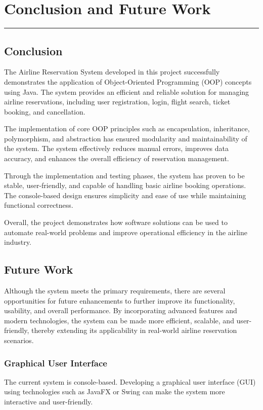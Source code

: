 \chapter{Conclusion and Future Work}
\noindent\rule{\linewidth}{2pt}
\section{Conclusion}

The Airline Reservation System developed in this project successfully demonstrates the application of Object-Oriented Programming (OOP) concepts using Java. The system provides an efficient and reliable solution for managing airline reservations, including user registration, login, flight search, ticket booking, and cancellation.

The implementation of core OOP principles such as encapsulation, inheritance, polymorphism, and abstraction has ensured modularity and maintainability of the system. The system effectively reduces manual errors, improves data accuracy, and enhances the overall efficiency of reservation management.

Through the implementation and testing phases, the system has proven to be stable, user-friendly, and capable of handling basic airline booking operations. The console-based design ensures simplicity and ease of use while maintaining functional correctness.

Overall, the project demonstrates how software solutions can be used to automate real-world problems and improve operational efficiency in the airline industry.

\section{Future Work}
Although the system meets the primary requirements, there are several opportunities for future enhancements to further improve its functionality, usability, and overall performance. By incorporating advanced features and modern technologies, the system can be made more efficient, scalable, and user-friendly, thereby extending its applicability in real-world airline reservation scenarios.
\subsection{Graphical User Interface}

The current system is console-based. Developing a graphical user interface (GUI) using technologies such as JavaFX or Swing can make the system more interactive and user-friendly.

